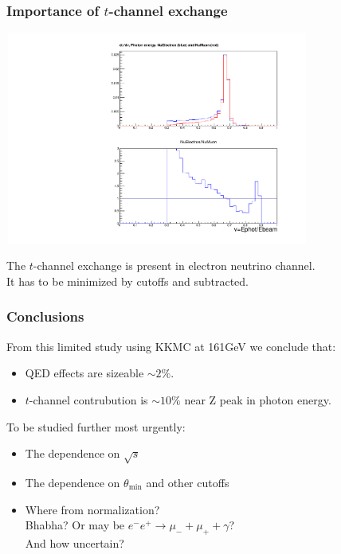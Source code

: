 \documentclass{beamer}
\begin{document}
\begin{frame}[fragile]
\frametitle{\bf Importance of $t$-channel exchange}

\vspace{-2mm}
{\includegraphics[width=100mm,height=70mm]{mcNuDiff.pdf}}

\small
The $t$-channel exchange is present in electron neutrino channel.\\
It has to be minimized by cutoffs and subtracted.

\end{frame}

\begin{frame}[fragile]
\frametitle{\bf Conclusions}
\small
From this limited study using KKMC at 161GeV we conclude that:
\begin{itemize}
\item
QED effects are sizeable $\sim 2\%$.
\item
$t$-channel contrubution is $\sim 10\%$ near Z peak in photon energy.
\end{itemize}

To be studied further most urgently:
\begin{itemize}
\item
The dependence on $\sqrt{s}$
\item
The dependence on $\theta_{\min}$ and other cutoffs
\item
Where from normalization?\\
Bhabha? Or may be $e^-e^+\to\mu_- +\mu_+ +\gamma$?\\
And how uncertain?
\end{itemize}

\end{frame}
\end{document}
